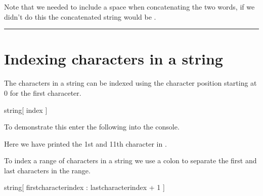 \documentclass[letterpaper,10pt,english]{jupyterBook}
\begin{document}
\sphinxAtStartPar
Note that we needed to include a space  when concatenating the two words, if we didn’t do this the concatenated string would be .


\bigskip\hrule\bigskip



\part{Indexing characters in a string}
\label{\detokenize{_pages/1.3_Strings:indexing-characters-in-a-string}}
\sphinxAtStartPar
The characters in a string can be indexed using the character position starting at 0 for the first characeter.

\begin{sphinxVerbatim}[commandchars=\\\{\}]
string[ index ]
\end{sphinxVerbatim}

\sphinxAtStartPar
To demonstrate this enter the following into the console.

\begin{sphinxVerbatim}[commandchars=\\\{\}]
 \PYG{p}{[}\PYG{p}{]}   

 \PYG{p}{[}\PYG{p}{]} \PYG{p}{[}\PYG{p}{]}

 \PYG{p}{[}\PYG{p}{]} \PYG{p}{[}\PYG{p}{]}
\end{sphinxVerbatim}

\sphinxAtStartPar
Here we have printed the 1st and 11th character in .

\sphinxAtStartPar
To index a range of characters in a string we use a colon to separate the first and last characters in the range.

\begin{sphinxVerbatim}[commandchars=\\\{\}]
string[ first\PYGZus{}character\PYGZus{}index : last\PYGZus{}character\PYGZus{}index + 1 ]
\end{sphinxVerbatim}
\end{document}
